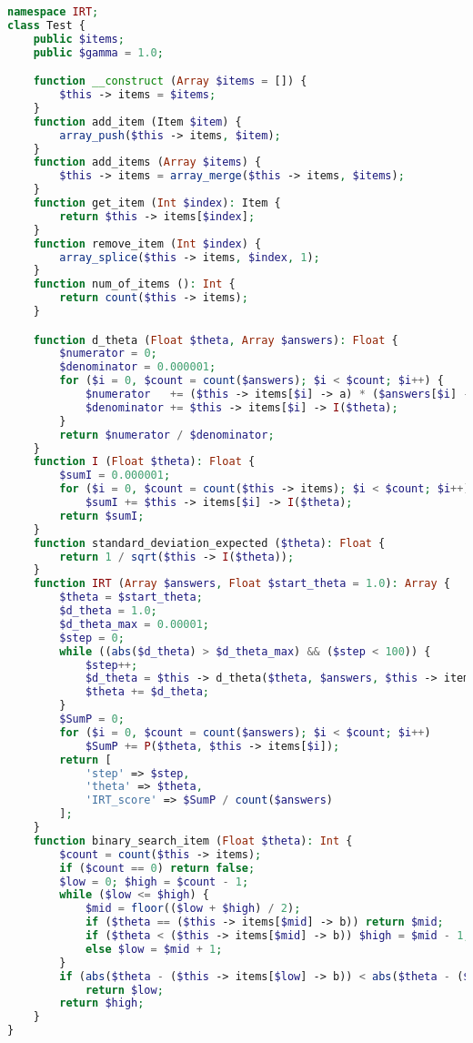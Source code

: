 \begin{lstlisting}[language=php,caption=Class bài kiểm tra]
namespace IRT;
class Test {
	public $items;
	public $gamma = 1.0;

	function __construct (Array $items = []) {
		$this -> items = $items;
	}
	function add_item (Item $item) {
		array_push($this -> items, $item);
	}
	function add_items (Array $items) {
		$this -> items = array_merge($this -> items, $items);
	}
	function get_item (Int $index): Item {
		return $this -> items[$index];
	}
	function remove_item (Int $index) {
		array_splice($this -> items, $index, 1);
	}
	function num_of_items (): Int {
		return count($this -> items);
	}

	function d_theta (Float $theta, Array $answers): Float {
		$numerator = 0;
		$denominator = 0.000001;
		for ($i = 0, $count = count($answers); $i < $count; $i++) {
			$numerator   += ($this -> items[$i] -> a) * ($answers[$i] - ($this -> items[$i] -> P($theta)));
			$denominator += $this -> items[$i] -> I($theta);
		}
		return $numerator / $denominator;
	}
	function I (Float $theta): Float {
		$sumI = 0.000001;
		for ($i = 0, $count = count($this -> items); $i < $count; $i++)
			$sumI += $this -> items[$i] -> I($theta);
		return $sumI;
	}
	function standard_deviation_expected ($theta): Float {
		return 1 / sqrt($this -> I($theta));
	}
	function IRT (Array $answers, Float $start_theta = 1.0): Array {
		$theta = $start_theta;
		$d_theta = 1.0;
		$d_theta_max = 0.00001;
		$step = 0;
		while ((abs($d_theta) > $d_theta_max) && ($step < 100)) {
			$step++;
			$d_theta = $this -> d_theta($theta, $answers, $this -> items);
			$theta += $d_theta;
		}
		$SumP = 0;
		for ($i = 0, $count = count($answers); $i < $count; $i++)
			$SumP += P($theta, $this -> items[$i]);
		return [
			'step' => $step,
			'theta' => $theta,
			'IRT_score' => $SumP / count($answers)
		];
	}
	function binary_search_item (Float $theta): Int {
		$count = count($this -> items);
		if ($count == 0) return false;
		$low = 0; $high = $count - 1;
		while ($low <= $high) {
			$mid = floor(($low + $high) / 2);
			if ($theta == ($this -> items[$mid] -> b)) return $mid;
			if ($theta < ($this -> items[$mid] -> b)) $high = $mid - 1;
			else $low = $mid + 1;
		}
		if (abs($theta - ($this -> items[$low] -> b)) < abs($theta - ($this -> items[$high] -> b)))
			return $low;
		return $high;
	}
}
\end{lstlisting}
